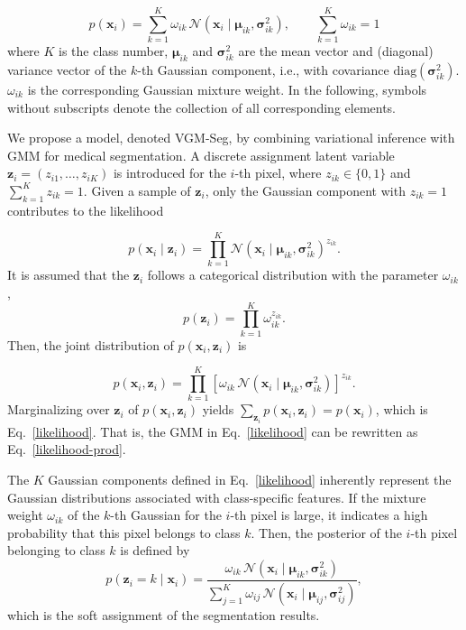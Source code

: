 \documentclass[preprint,12pt]{elsarticle}
\begin{document}
\begin{equation}
\label{likelihood}
p(\mathbf{x}_i) = \sum_{k=1}^{K} \omega_{ik} \, \mathcal{N}(\mathbf{x}_i \mid \boldsymbol{\mu}_{ik}, \boldsymbol{\sigma}^2_{ik}), \qquad
\sum_{k=1}^{K} \omega_{ik} = 1
\end{equation}
where $K$ is the class number, 
$\boldsymbol{\mu}_{ik}$ and $\boldsymbol{\sigma}^2_{ik}$ are the mean vector and (diagonal) variance vector of the $k$-th Gaussian component, i.e., with covariance $\mathrm{diag}(\boldsymbol{\sigma}^2_{ik})$. $\omega_{ik}$ is the corresponding Gaussian mixture weight. 
In the following, symbols without subscripts denote the collection of all corresponding elements.


We propose a model, denoted VGM-Seg, by combining variational inference with GMM for medical segmentation. 
A discrete assignment latent variable $\mathbf{z}_i = (z_{i1}, \dots, z_{iK})$ is introduced for the $i$-th pixel, where $z_{ik} \in \{0,1\}$ and $\sum_{k=1}^{K} z_{ik} = 1$. 
%
Given a sample of $\mathbf{z}_i$, only the Gaussian component with $z_{ik} = 1$ contributes to the likelihood

\begin{equation}
\label{likelihood-prod}
p(\mathbf{x}_i \mid \mathbf{z}_i) =
\prod_{k=1}^{K}
\mathcal{N}(\mathbf{x}_i \mid \boldsymbol{\mu}_{ik}, \boldsymbol{\sigma}^2_{ik})^{z_{ik}}.
\end{equation}
%
It is assumed that the $\mathbf{z}_i$ follows a categorical distribution with the parameter $\omega_{ik}$,
\begin{equation}
p(\mathbf{z}_i) = \prod_{k=1}^{K} \omega_{ik}^{z_{ik}}.
\end{equation}
Then, the joint distribution of $p(\mathbf{x}_i, \mathbf{z}_i)$ is

\begin{equation}
p(\mathbf{x}_i, \mathbf{z}_i) =
\prod_{k=1}^{K}
\left[
\omega_{ik} \, \mathcal{N}(\mathbf{x}_i \mid \boldsymbol{\mu}_{ik}, \boldsymbol{\sigma}^2_{ik})
\right]^{z_{ik}}.
\end{equation}
%
Marginalizing over $\mathbf{z}_i$ of $p(\mathbf{x}_i, \mathbf{z}_i )$ yields $\sum_{\mathbf{z}_i} p(\mathbf{x}_i, \mathbf{z}_i) = p(\mathbf{x}_i)$, which is Eq.~\eqref{likelihood}.
That is, the GMM in Eq.~\eqref{likelihood} can be rewritten as Eq.~\eqref{likelihood-prod}.
%
%


The $K$ Gaussian components defined in Eq.~\eqref{likelihood} inherently represent the Gaussian distributions associated with class-specific features. If the mixture weight $\omega_{ik}$ of the $k$-th Gaussian for the $i$-th pixel is large, it indicates a high probability that this pixel belongs to class $k$.
%
Then, the posterior of the $i$-th pixel belonging to class $k$ is defined by
\begin{equation}
p(\mathbf{z}_i = k \mid \mathbf{x}_i) =
\frac{\omega_{ik} \, \mathcal{N}(\mathbf{x}_i \mid \boldsymbol{\mu}_{ik}, \boldsymbol{\sigma}^2_{ik})}
{\sum_{j=1}^{K} \omega_{ij} \, \mathcal{N}(\mathbf{x}_i \mid \boldsymbol{\mu}_{ij}, \boldsymbol{\sigma}^2_{ij})},
\end{equation}
which is the soft assignment of the segmentation results.
\end{document}
